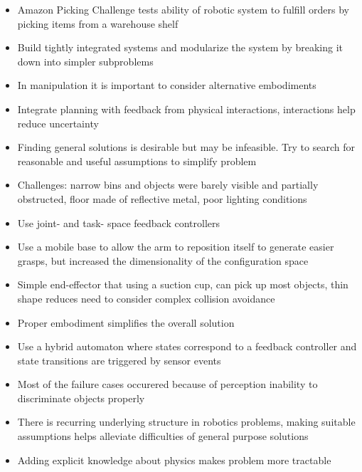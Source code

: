 \begin{itemize}
  \item Amazon Picking Challenge tests ability of robotic system to fulfill orders by picking items from a warehouse shelf
  \item Build tightly integrated systems and modularize the system by breaking it down into simpler subproblems
  \item In manipulation it is important to consider alternative embodiments
  \item Integrate planning with feedback from physical interactions, interactions help reduce uncertainty
  \item Finding general solutions is desirable but may be infeasible. Try to search for reasonable and useful assumptions to simplify problem
  \item Challenges: narrow bins and objects were barely visible and partially obstructed, floor made of reflective metal, poor lighting conditions
  \item Use joint- and task- space feedback controllers
  \item Use a mobile base to allow the arm to reposition itself to generate easier grasps, but increased the dimensionality of the configuration space
  \item Simple end-effector that using a suction cup, can pick up most objects, thin shape reduces need to consider complex collision avoidance
  \item Proper embodiment simplifies the overall solution
  \item Use a hybrid automaton where states correspond to a feedback controller and state transitions are triggered by sensor events
  \item Most of the failure cases occurered because of perception inability to discriminate objects properly
  \item There is recurring underlying structure in robotics problems, making suitable assumptions helps alleviate difficulties of general purpose solutions
  \item Adding explicit knowledge about physics makes problem more tractable
\end{itemize}